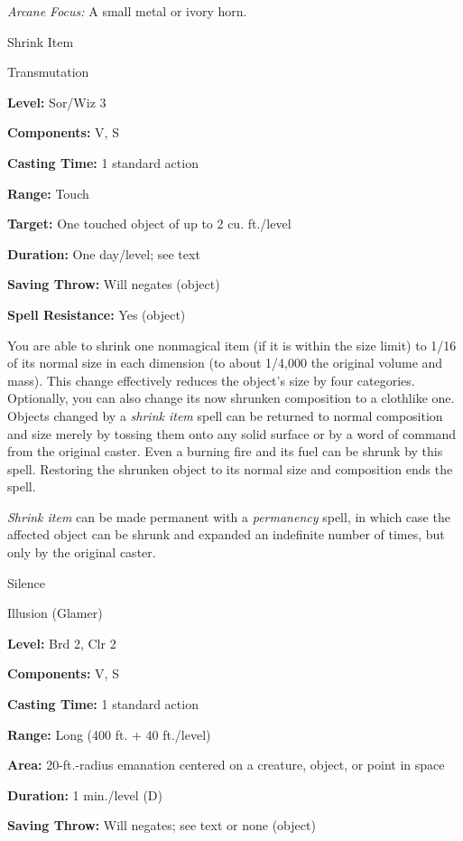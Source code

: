 \documentclass{article}
\begin{document}
\textit{Arcane Focus: }A small metal or ivory horn.

\vspace{12pt}
Shrink Item

Transmutation

\textbf{Level:} Sor/Wiz 3

\textbf{Components:} V, S

\textbf{Casting Time:} 1 standard action

\textbf{Range:} Touch

\textbf{Target:} One touched object of up to 2 cu. ft./level

\textbf{Duration:} One day/level; see text

\textbf{Saving Throw: }Will negates (object)

\textbf{Spell Resistance:} Yes (object)

You are able to shrink one nonmagical item (if it is within the size limit) to 
1/16 of its normal size in each dimension (to about 1/4,000 the original volume 
and mass). This change effectively reduces the object's size by four categories. 
Optionally, you can also change its now shrunken composition to a clothlike one. 
Objects changed by a \textit{shrink item }spell can be returned to normal composition 
and size merely by tossing them onto any solid surface or by a word of command 
from the original caster. Even a burning fire and its fuel can be shrunk by this 
spell. Restoring the shrunken object to its normal size and composition ends the 
spell.

\textit{Shrink item }can be made permanent with a \textit{permanency }spell, in 
which case the affected object can be shrunk and expanded an indefinite number 
of times, but only by the original caster.

\vspace{12pt}
Silence

Illusion (Glamer)

\textbf{Level:} Brd 2, Clr 2

\textbf{Components:} V, S

\textbf{Casting Time:} 1 standard action

\textbf{Range:} Long (400 ft. + 40 ft./level)

\textbf{Area:} 20-ft.-radius emanation centered on a creature, object, or point 
in space

\textbf{Duration:} 1 min./level (D)

\textbf{Saving Throw: }Will negates; see text or none (object)
\end{document}
